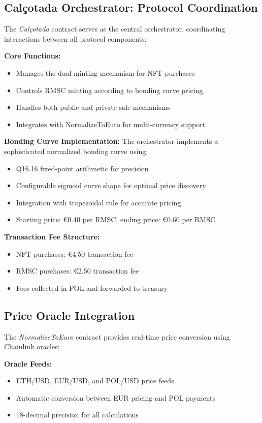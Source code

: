 \documentclass[conference]{IEEEtran}
\begin{document}
\subsection{Calçotada Orchestrator: Protocol Coordination}

The \textit{Calçotada} contract serves as the central orchestrator, coordinating interactions between all protocol components:

\textbf{Core Functions:}
\begin{itemize}
    \item Manages the dual-minting mechanism for NFT purchases
    \item Controls RMSC minting according to bonding curve pricing
    \item Handles both public and private sale mechanisms
    \item Integrates with NormalizeToEuro for multi-currency support
\end{itemize}

\textbf{Bonding Curve Implementation:}
The orchestrator implements a sophisticated normalized bonding curve using:
\begin{itemize}
    \item Q16.16 fixed-point arithmetic for precision
    \item Configurable sigmoid curve shape for optimal price discovery
    \item Integration with trapezoidal rule for accurate pricing
    \item Starting price: €0.40 per RMSC, ending price: €0.60 per RMSC
\end{itemize}

\textbf{Transaction Fee Structure:}
\begin{itemize}
    \item NFT purchases: €4.50 transaction fee
    \item RMSC purchases: €2.50 transaction fee
    \item Fees collected in POL and forwarded to treasury
\end{itemize}

\subsection{Price Oracle Integration}

The \textit{NormalizeToEuro} contract provides real-time price conversion using Chainlink oracles:

\textbf{Oracle Feeds:}
\begin{itemize}
    \item ETH/USD, EUR/USD, and POL/USD price feeds
    \item Automatic conversion between EUR pricing and POL payments
    \item 18-decimal precision for all calculations
\end{itemize}
\end{document}
